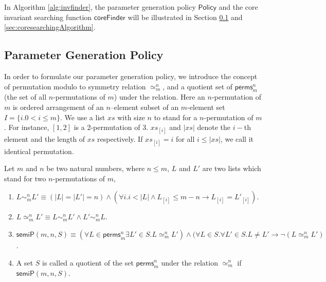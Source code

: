 \documentclass[final]{IEEEtran}
\newcommand\caicomment[1]{\textcolor{red}{comment: #1} }
\begin{document}
{In Algorithm \ref{alg:invfinder}, the parameter generation policy $\mathsf{Policy}$  and the core invariant searching function $\mathsf{coreFinder}$ will be illustrated in Section \ref{sec:parameterGenPolicy} and \ref{sec:coresearchingAlgorithm}.


\vspace{-0.5cm}
\subsection{Parameter Generation Policy}\label{sec:parameterGenPolicy}
In order to formulate our parameter generation policy, we introduce the concept of permutation modulo to symmetry relation $\simeq_m^n$,  and a quotient set of $\mathsf{perms}_{m}^{n}$ (the set of all $n$-permutations of $m$) under the  relation.  Here an $n$-permutation of $m$ is ordered arrangement of  an $n$--element subset of an $m$-element set $I=\{i. 0<i\le m\}$. We use a list $xs$ with size $n$ to stand for a $n$-permutation of $m$. For instance, $[1,2]$ is a 2-permutation of 3. $xs_{[i]}$ and $|xs|$  denote  the $i-$th element and the length of $xs$ respectively. If $xs_{[i]}=i$ for all $i \le |xs|$, we call it identical permutation. %

\begin{definition}
Let $m$ and $n$ be two natural numbers, where $n \le m$,  $L$ and $L'$ are two lists which stand for two  $n$-permutations of $m$,
\begin{enumerate}
\item
$L \sim_m^n L' \equiv (|L| =|L'|=n) \wedge (\forall i. i<|L| \wedge L_{[i]} \le m-n \longrightarrow L_{[i]}=L'_{[i]}) $.

\item $L \simeq_m^n L' \equiv L \sim_m^n L' \wedge   L' \sim_m^n L$.


\item $\mathsf{semiP}(m,n,S)\equiv (\forall  L \in \mathsf{perms}_{m}^{n} \exists  L' \in S. L \simeq_m^n L' ) \wedge (\forall  L\in S. \forall L'\in S. L \neq L' \longrightarrow \neg  (L \simeq_m^n L' )$.

\item    A set $S$ is called a quotient of the set $\mathsf{perms}_{m}^{n}$ under the relation $\simeq_m^n$ if    $\mathsf{semiP}(m,n,S)$.
\end{enumerate}
\end{definition}

}
\end{document}

